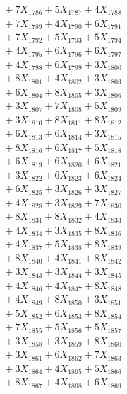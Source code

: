 \documentclass[a4paper,10pt]{article}
\begin{document}
{\begin{align}
&\;  + 7 X_{1786} + 5 X_{1787} + 4 X_{1788} \\[0.3ex]
&\;  + 7 X_{1789} + 4 X_{1790} + 6 X_{1791} \\[0.3ex]
&\;  + 7 X_{1792} + 5 X_{1793} + 5 X_{1794} \\[0.3ex]
&\;  + 4 X_{1795} + 6 X_{1796} + 6 X_{1797} \\[0.3ex]
&\;  + 4 X_{1798} + 6 X_{1799} + 3 X_{1800} \\[0.3ex]
&\;  + 8 X_{1801} + 4 X_{1802} + 3 X_{1803} \\[0.3ex]
&\;  + 6 X_{1804} + 8 X_{1805} + 3 X_{1806} \\[0.3ex]
&\;  + 3 X_{1807} + 7 X_{1808} + 5 X_{1809} \\[0.5ex]\allowbreak
&\;  + 3 X_{1810} + 8 X_{1811} + 8 X_{1812} \\[0.3ex]
&\;  + 6 X_{1813} + 6 X_{1814} + 3 X_{1815} \\[0.3ex]
&\;  + 8 X_{1816} + 6 X_{1817} + 5 X_{1818} \\[0.3ex]
&\;  + 6 X_{1819} + 6 X_{1820} + 6 X_{1821} \\[0.3ex]
&\;  + 3 X_{1822} + 6 X_{1823} + 6 X_{1824} \\[0.3ex]
&\;  + 6 X_{1825} + 3 X_{1826} + 3 X_{1827} \\[0.3ex]
&\;  + 4 X_{1828} + 3 X_{1829} + 7 X_{1830} \\[0.3ex]
&\;  + 8 X_{1831} + 8 X_{1832} + 4 X_{1833} \\[0.3ex]
&\;  + 4 X_{1834} + 3 X_{1835} + 8 X_{1836} \\[0.3ex]
&\;  + 4 X_{1837} + 5 X_{1838} + 8 X_{1839} \\[0.5ex]\allowbreak
&\;  + 8 X_{1840} + 4 X_{1841} + 8 X_{1842} \\[0.3ex]
&\;  + 3 X_{1843} + 3 X_{1844} + 3 X_{1845} \\[0.3ex]
&\;  + 4 X_{1846} + 4 X_{1847} + 8 X_{1848} \\[0.3ex]
&\;  + 4 X_{1849} + 8 X_{1850} + 3 X_{1851} \\[0.3ex]
&\;  + 5 X_{1852} + 6 X_{1853} + 8 X_{1854} \\[0.3ex]
&\;  + 7 X_{1855} + 5 X_{1856} + 5 X_{1857} \\[0.3ex]
&\;  + 3 X_{1858} + 3 X_{1859} + 8 X_{1860} \\[0.3ex]
&\;  + 3 X_{1861} + 6 X_{1862} + 7 X_{1863} \\[0.3ex]
&\;  + 3 X_{1864} + 4 X_{1865} + 5 X_{1866} \\[0.3ex]
&\;  + 8 X_{1867} + 4 X_{1868} + 6 X_{1869} \\[0.5ex]\allowbreak

\end{align}}
\end{document}
